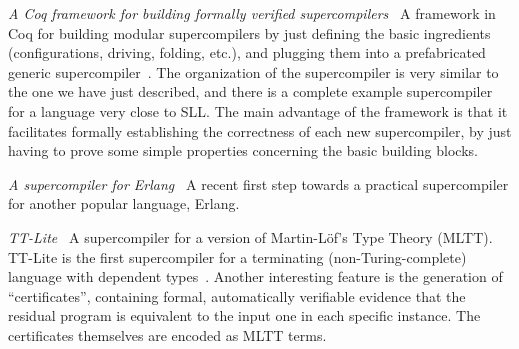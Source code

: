 \begin{longitem}
\item \emph{A Coq framework for building formally verified supercompilers~\cite{CoqGenScpUrl}} 
A framework in Coq for building modular supercompilers by just defining 
the basic ingredients (configurations, driving, folding, etc.),
and plugging them into a prefabricated generic supercompiler~\cite{TFP2012:CoqGenScp}.
The organization of the supercompiler is very similar to the one we have just described,
and there is a complete example supercompiler for a language very close to SLL\@.
The main advantage of the framework is that it facilitates formally establishing
the correctness of each new supercompiler, by just having to prove some simple properties
concerning the basic building blocks.

\item \emph{A supercompiler for Erlang~\cite{ErlangScpUrl}} A recent
first step towards a practical supercompiler for another popular language, Erlang.

\item \emph{TT-Lite~\cite{TTliteUrl}} A supercompiler
for a version of Martin-L\"{o}f's Type Theory (MLTT).
TT-Lite is the first supercompiler for a terminating (non-Turing-complete) language
with dependent types~\cite{Klyuchnikov2013TTLite}. 
Another interesting feature is the generation of ``certificates'',
containing formal, automatically verifiable evidence 
that the residual program is equivalent to the input one in each specific instance. 
The certificates themselves are encoded as MLTT terms.

\end{longitem}
